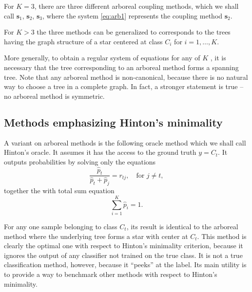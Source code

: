 For $K=3$, there are three different arboreal coupling methods, which we shall call $\boldsymbol{s}_1$, $\boldsymbol{s}_2$, $\boldsymbol{s}_3$, where the system \eqref{eq:arb1} represents the coupling method $\boldsymbol{s}_2$.

For $K>3$ the three methods can be generalized to corresponds to the trees having the graph structure  of a star centered at class $C_i$ for $i=1, \ldots, K$.

More generally, to obtain a regular system of equations for  any of $K$ , it is necessary that the tree corresponding to an arboreal method forms a spanning tree. Note that any arboreal method is non-canonical, because there is no natural way to choose a tree in a complete graph. In fact, a stronger statement is true -- no arboreal method is symmetric.



\subsection{Methods emphasizing Hinton's minimality}

A variant on arboreal methods is the following oracle method which we shall call Hinton's oracle. It  assumes it has the access to the ground truth $y = C_t$. It outputs probabilities by solving only the equations
$$
\frac{\hat p_t}{\hat p_t + \hat p_j} = {r}_{tj},\quad \textrm{for }j\not = t,
$$
together the  with total sum equation
$$
\sum_{i=1}^K  \hat p_i = 1.
$$

For any one sample belonging to class $C_t$, its result is identical to the arboreal method where the underlying tree forms a star with center at $C_t$. This method is clearly the optimal one with respect to Hinton's minimality criterion, because it ignores the output of any classifier not trained on the true class. It is not a true classification method, however, because it ``peeks'' at the label. Its main utility is to provide a way to benchmark other methods with respect to Hinton's minimality.

